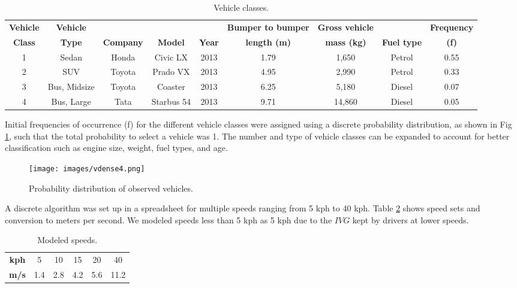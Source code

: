 \begin{table}[]
\centering
\caption{Vehicle classes.}
\label{tb1:vehicletypes}
\begin{tabular}{@{}ccccccccc@{}}
\toprule
\textbf{Vehicle} & \textbf{Vehicle} & \textbf{} & \textbf{} & \textbf{} & \textbf{Bumper to bumper} & \textbf{Gross vehicle} & \textbf{} & \textbf{Frequency} \\ 
\textbf{Class} & \textbf{Type} & \textbf{Company} & \textbf{Model} & \textbf{Year} & \textbf{length (m)} & \textbf{mass (kg)} & \textbf{Fuel type} & \textbf{(f)} \\ \midrule
1 & Sedan & Honda & Civic LX & 2013 & 1.79 & 1,650 & Petrol & 0.55 \\
2 & SUV & Toyota & Prado VX & 2013 & 4.95 & 2,990 & Petrol & 0.33 \\
3 & Bus, Midsize & Toyota & Coaster & 2013 & 6.25 & 5,180 & Diesel & 0.07 \\
4 & Bus, Large & Tata & Starbus 54 & 2013 & 9.71 & 14,860 & Diesel & 0.05 \\ \bottomrule
\end{tabular}
\end{table}

Initial frequencies of occurrence (f) for the different vehicle classes were assigned using a discrete probability distribution, as shown in Fig \ref{fig4:vehobs}, such that the total probability to select a vehicle was 1.  The number and type of vehicle classes can be expanded to account for better classification such as engine size, weight, fuel types, and age.
 
%
\begin{figure}
\texttt{[image: images/vdense4.png]} 
\caption{Probability distribution of observed vehicles.}
\label{fig4:vehobs}
\end{figure}
%

A discrete algorithm was set up in a spreadsheet for multiple speeds ranging from 5 kph to 40 kph.  Table \ref{tb2:modelspeeds} shows speed sets and conversion to meters per second.  We modeled speeds less than 5 kph as 5 kph due to the $IVG$ kept by drivers at lower speeds.

\begin{table}[]
\centering
\caption{Modeled speeds.}
\label{tb2:modelspeeds}
\begin{tabular}{cccccc}
\textbf{kph} & 5   & 10  & 15  & 20  & 40   \\
\textbf{m/s} & 1.4 & 2.8 & 4.2 & 5.6 & 11.2
\end{tabular}
\end{table}

